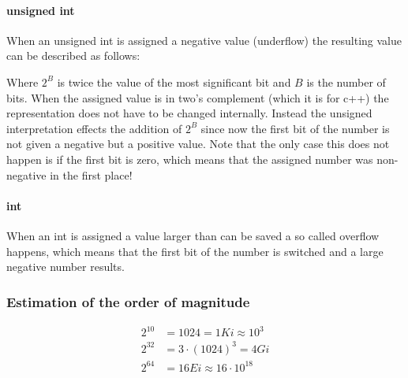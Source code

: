 \documentclass[10pt,a4paper]{scrartcl}
\begin{document}
\begin{multicols*}{2}
\paragraph{unsigned int}

When an unsigned int is assigned a negative value (underflow) the resulting value can be described as follows:


Where $2^B$ is twice the value of the most significant bit and $B$ is the number of bits. When the assigned value is in two's complement (which it is for c++) the representation does not have to be changed internally. Instead the unsigned interpretation effects the addition of $2^B$ since now the first bit of the number is not given a negative but a positive value. Note that the only case this does not happen is if the first bit is zero, which means that the assigned number was non-negative in the first place!

\paragraph{int}

When an int is assigned a value larger than can be saved a so called overflow happens, which means that the first bit of the number is switched and a large negative number results.

\subsubsection{Estimation of the order of magnitude}

\begin{align*}
2^{10}&=1024=1Ki\approx 10^3\\
2^{32}&=3\cdot(1024)^3= 4Gi\\
2^{64}&=16Ei\approx 16\cdot10^{18}
\end{align*}

\subsubsection{}


\end{multicols*}
\end{document}
